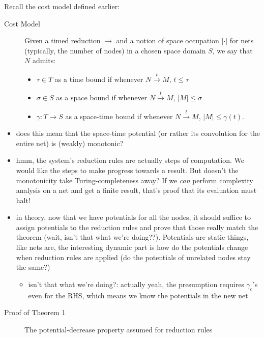 \documentclass{fit-teorsem}
\begin{document}
\begin{itemize}
		Recall the cost model defined earlier:
		\begin{description}
			\item[Cost Model] Given a timed reduction $\longrightarrow$ and a notion of space
				occupation $|\cdot|$ for nets (typically, the number of nodes) in a chosen
				space domain $S$, we say that $N$ admits:
				\begin{itemize}
					\item $\tau \in T$ as a time bound if whenever
						$N \stackrel{t}{\longrightarrow} M$, $t \le \tau$
					\item $\sigma \in S$ as a space bound if whenever
						$N \stackrel{t}{\longrightarrow} M$, $|M| \le \sigma$
					\item $\gamma : T \to S$ as a space-time bound if whenever
						$N \stackrel{t}{\longrightarrow} M$, $|M| \le \gamma(t).$
				\end{itemize}
		\end{description}
		\begin{itemize}
			\item does this mean that the space-time potential (or rather its convolution for the entire net)
				is (weakly) monotonic?
			\item hmm, the system's reduction rules are actually steps of computation. We would like
				the steps to make progress towards a result. But doesn't the monotonicity take
				Turing-completeness away? If we \textit{can} perform complexity analysis on a net
				and get a finite result, that's proof that its evaluation must halt!
			\item in theory, now that we have potentials for all the nodes, it should suffice
				to assign potentials to the reduction rules and prove that those really match
				the theorem (wait, isn't that what we're doing??). Potentials are static things,
				like nets are, the interesting dynamic part is how do the potentials change
				when reduction rules are applied (do the potentials of unrelated nodes stay
				the same?)
				\begin{itemize}
					\item isn't that what we're doing?: actually yeah, the presumption requires
						$\gamma_c$'s even for the RHS, which means we know the potentials in the
						new net
				\end{itemize}
		\end{itemize}
		\begin{description}
			\item[Proof of Theorem 1] The potential-decrease property assumed for reduction rules

\end{description}
\end{itemize}
\end{document}
